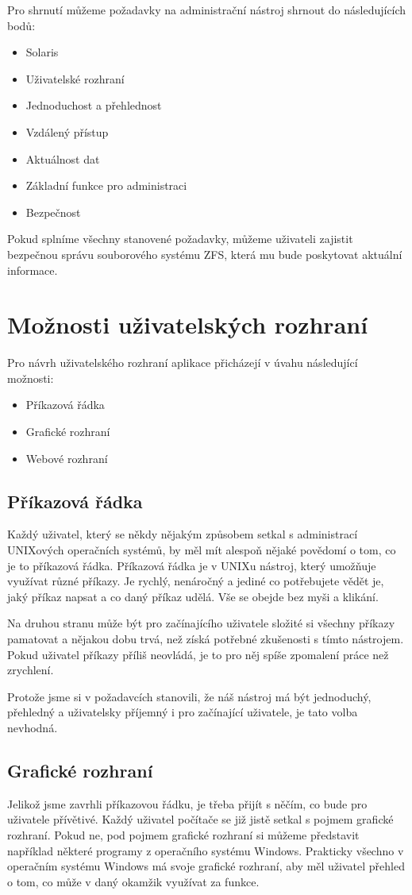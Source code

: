 Pro shrnutí můžeme požadavky na administrační nástroj shrnout do následujících bodů:
\begin{itemize}
    \item Solaris
    \item Uživatelské rozhraní
    \item Jednoduchost a přehlednost
    \item Vzdálený přístup
    \item Aktuálnost dat
    \item Základní funkce pro administraci
    \item Bezpečnost
\end{itemize}

Pokud splníme všechny stanovené požadavky, můžeme uživateli zajistit bezpečnou správu souborového systému ZFS, která mu bude poskytovat aktuální informace.
\section{Možnosti uživatelských rozhraní}
Pro návrh uživatelského rozhraní aplikace přicházejí v úvahu následující možnosti:
\begin{itemize}
  \item Příkazová řádka
  \item Grafické rozhraní
  \item Webové rozhraní
\end{itemize}
    \subsection{Příkazová řádka}
    Každý uživatel, který se někdy nějakým způsobem setkal s administrací UNIXových operačních systémů, by měl mít alespoň nějaké povědomí o tom, co je to příkazová řádka. Příkazová řádka je v UNIXu nástroj, který umožňuje využívat různé příkazy. Je rychlý, nenáročný a jediné co potřebujete vědět je, jaký příkaz napsat a co daný příkaz udělá. Vše se obejde bez myši a klikání.

    Na druhou stranu může být pro začínajícího uživatele složité si všechny příkazy pamatovat a nějakou dobu trvá, než získá potřebné zkušenosti s tímto nástrojem. Pokud uživatel příkazy příliš neovládá, je to pro něj spíše zpomalení práce než zrychlení.

    Protože jsme si v požadavcích stanovili, že náš nástroj má být jednoduchý, přehledný a uživatelsky příjemný i pro začínající uživatele, je tato volba nevhodná.
    \subsection{Grafické rozhraní}
    Jelikož jsme zavrhli příkazovou řádku, je třeba přijít s něčím, co bude pro uživatele přívětivé. Každý uživatel počítače se již jistě setkal s pojmem grafické rozhraní. Pokud ne, pod pojmem grafické rozhraní si můžeme představit například některé programy z operačního systému Windows. Prakticky všechno v operačním systému Windows má svoje grafické rozhraní, aby měl uživatel přehled o tom, co může v daný okamžik využívat za funkce.

